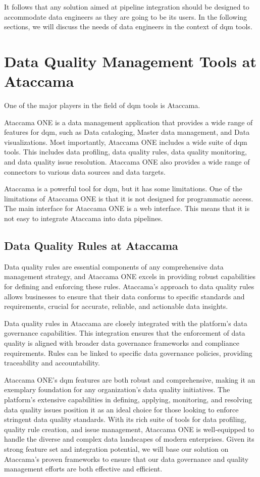  It follows that any solution aimed at pipeline integration  should be designed to accommodate data engineers as they are going to be its users. In the following sections, we will discuss the needs of data engineers in the context of \acrshort{dqm} tools.

\section{Data Quality Management Tools at Ataccama}

One of the major players in the field of \acrshort{dqm} tools is Ataccama. 

Ataccama ONE is a data management application that provides a wide range of features for \acrshort{dqm}, such as Data cataloging, Master data management, and Data visualizations. Most importantly, Ataccama ONE includes a wide suite of \acrshort{dqm} tools. This includes data profiling, data quality rules, data quality monitoring, and data quality issue resolution. Ataccama ONE also provides a wide range of connectors to various data sources and data targets.

Ataccama is a powerful tool for \acrshort{dqm}, but it has some limitations. One of the limitations of Ataccama ONE is that it is not designed for programmatic access. The main interface for Ataccama ONE is a web interface. This means that it is not easy to integrate Ataccama into data pipelines.

\subsection{Data Quality Rules at Ataccama}

Data quality rules are essential components of any comprehensive data management strategy, and Ataccama ONE excels in providing robust capabilities for defining and enforcing these rules. Ataccama's approach to data quality rules allows businesses to ensure that their data conforms to specific standards and requirements, crucial for accurate, reliable, and actionable data insights.

Data quality rules in Ataccama are closely integrated with the platform's data governance capabilities. This integration ensures that the enforcement of data quality is aligned with broader data governance frameworks and compliance requirements. Rules can be linked to specific data governance policies, providing traceability and accountability.

Ataccama ONE's \acrshort{dqm} features are both robust and comprehensive, making it an exemplary foundation for any organization's data quality initiatives. The platform's extensive capabilities in defining, applying, monitoring, and resolving data quality issues position it as an ideal choice for those looking to enforce stringent data quality standards. With its rich suite of tools for data profiling, quality rule creation, and issue management, Ataccama ONE is well-equipped to handle the diverse and complex data landscapes of modern enterprises. Given its strong feature set and integration potential, we will base our solution on Ataccama's proven frameworks to ensure that our data governance and quality management efforts are both effective and efficient.

